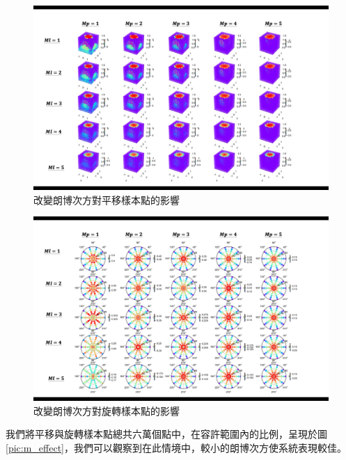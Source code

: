 \begin{figure}[h!]
    \centering
    \includegraphics[width=14cm]{ch4pic/m_translate.png}
    \caption{改變朗博次方對平移樣本點的影響}
    \label{pic:m_translate}
\end{figure}
\begin{figure}[h!]
    \centering
    \includegraphics[width=14cm]{ch4pic/m_rotate.png}
    \caption{改變朗博次方對旋轉樣本點的影響}
    \label{pic:m_rotate}
\end{figure}

我們將平移與旋轉樣本點總共六萬個點中，在容許範圍內的比例，呈現於圖\ref{pic:m_effect}，我們可以觀察到在此情境中，較小的朗博次方使系統表現較佳。

